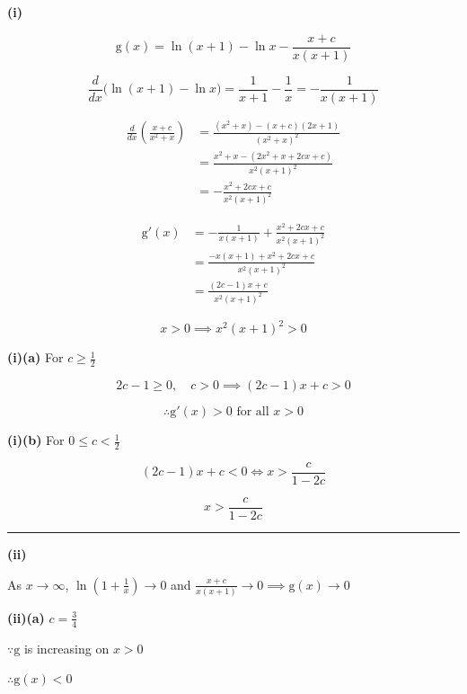 \documentclass[12pt]{article}
\begin{document}
\newcommand{\ds}{\displaystyle}

\textbf{(i)}

$$\mathrm{g}(x)=\ln(x+1)-\ln x-\frac{x+c}{x(x+1)}$$

$$\frac{d}{dx}\Big(\ln(x+1)-\ln x\Big)=\frac1{x+1}-\frac1x=-\frac1{x(x+1)}$$

\begin{align*}
\frac{d}{dx}\left(\frac{x+c}{x^2+x}\right)
&=\frac{\left(x^2+x\right)-(x+c)(2x+1)}{\left(x^2+x\right)^2}\\
&=\frac{x^2+x-\left(2x^2+x+2cx+c\right)}{x^2(x+1)^2}\\
&=-\frac{x^2+2cx+c}{x^2(x+1)^2}
\end{align*}

\begin{align*}
\mathrm{g}'(x)
&=-\frac1{x(x+1)}+\frac{x^2+2cx+c}{x^2(x+1)^2}\\
&=\frac{-x(x+1)+x^2+2cx+c}{x^2(x+1)^2}\\
&=\frac{(2c-1)x+c}{x^2(x+1)^2}
\end{align*}

$$x>0\implies x^2(x+1)^2>0$$

\textbf{(i)(a)} For $\ds c\geq\frac12$

$$2c-1\geq0,\quad c>0\implies (2c-1)x+c>0$$

$$\therefore \boxed{\mathrm{g}'(x)>0\text{ for all }x>0}$$

\textbf{(i)(b)} For $\ds 0\leq c<\frac12$

$$(2c-1)x+c<0\iff x>\frac{c}{1-2c}$$

$$\boxed{x>\frac{c}{1-2c}}$$

\bigskip\hrule\bigskip

\textbf{(ii)}

As $\ds x\to\infty$, $\ds \ln\left(1+\frac1x\right)\to0$ and $\ds \frac{x+c}{x(x+1)}\to0 \implies \mathrm{g}(x)\to0$

\textbf{(ii)(a)} $\ds c=\frac34$

$\because \mathrm{g}$ is increasing on $x>0$

$\therefore \mathrm{g}(x)<0$

\begin{center}
\end{center}
\end{document}

